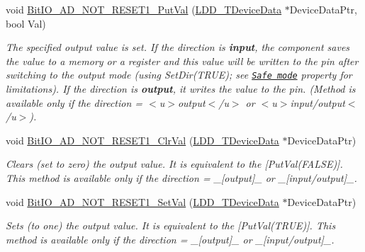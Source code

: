\begin{DoxyCompactItemize}
void \hyperlink{group___bit_i_o___a_d___n_o_t___r_e_s_e_t1__module_gac0549871ba4d8886adf1ee204b330d4e}{Bit\-I\-O\-\_\-\-A\-D\-\_\-\-N\-O\-T\-\_\-\-R\-E\-S\-E\-T1\-\_\-\-Put\-Val} (\hyperlink{group___p_e___types__module_gac5cf1362f1f0e3a2ce71b1bf2276d091}{L\-D\-D\-\_\-\-T\-Device\-Data} $\ast$Device\-Data\-Ptr, bool Val)
\begin{DoxyCompactList}\small\item\em The specified output value is set. If the direction is {\bfseries  input}, the component saves the value to a memory or a register and this value will be written to the pin after switching to the output mode (using {\ttfamily Set\-Dir(\-T\-R\-U\-E)}; see \href{BitIOProperties.html#SafeMode}{\tt Safe mode} property for limitations). If the direction is {\bfseries output}, it writes the value to the pin. (Method is available only if the direction = $<$u$>${\ttfamily output}$<$/u$>$ or $<$u$>${\ttfamily  input/output}$<$/u$>$). \end{DoxyCompactList}\item 
void \hyperlink{group___bit_i_o___a_d___n_o_t___r_e_s_e_t1__module_ga4049d8600c4d9d766fbd3bdd8341d8f3}{Bit\-I\-O\-\_\-\-A\-D\-\_\-\-N\-O\-T\-\_\-\-R\-E\-S\-E\-T1\-\_\-\-Clr\-Val} (\hyperlink{group___p_e___types__module_gac5cf1362f1f0e3a2ce71b1bf2276d091}{L\-D\-D\-\_\-\-T\-Device\-Data} $\ast$Device\-Data\-Ptr)
\begin{DoxyCompactList}\small\item\em Clears (set to zero) the output value. It is equivalent to the \mbox{[}Put\-Val(\-F\-A\-L\-S\-E)\mbox{]}. This method is available only if the direction = \-\_\-\mbox{[}output\mbox{]}\-\_\- or \-\_\-\mbox{[}input/output\mbox{]}\-\_\-. \end{DoxyCompactList}\item 
void \hyperlink{group___bit_i_o___a_d___n_o_t___r_e_s_e_t1__module_ga2311689c90571a1c7a93ec176f577fb5}{Bit\-I\-O\-\_\-\-A\-D\-\_\-\-N\-O\-T\-\_\-\-R\-E\-S\-E\-T1\-\_\-\-Set\-Val} (\hyperlink{group___p_e___types__module_gac5cf1362f1f0e3a2ce71b1bf2276d091}{L\-D\-D\-\_\-\-T\-Device\-Data} $\ast$Device\-Data\-Ptr)
\begin{DoxyCompactList}\small\item\em Sets (to one) the output value. It is equivalent to the \mbox{[}Put\-Val(\-T\-R\-U\-E)\mbox{]}. This method is available only if the direction = \-\_\-\mbox{[}output\mbox{]}\-\_\- or \-\_\-\mbox{[}input/output\mbox{]}\-\_\-. \end{DoxyCompactList}\end{DoxyCompactItemize}


